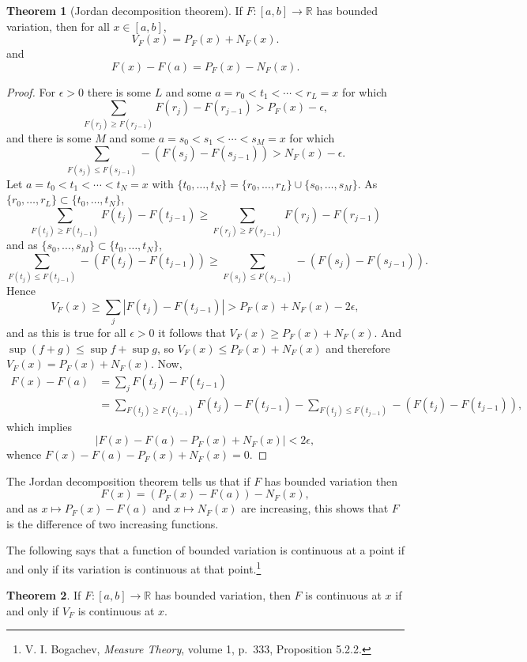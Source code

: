 \documentclass{article}
\theoremstyle{definition}
\newtheorem{theorem}{Theorem}
\theoremstyle{definition}
\begin{document}
\begin{theorem}[Jordan decomposition theorem]
If $F:[a,b] \to \mathbb{R}$ has bounded variation, then for all $x \in [a,b]$,
\[
V_F(x)=P_F(x)+N_F(x).
\]
and
\[
F(x)-F(a) = P_F(x)-N_F(x).
\]
\end{theorem}
\begin{proof}
For $\epsilon>0$ there is some $L$ and some $a=r_0<t_1<\cdots<r_L=x$ for which
\[
 \sum_{F(r_j) \geq F(r_{j-1})} F(r_j)-F(r_{j-1})>P_F(x)-\epsilon,
\]
and there is some $M$ and some $a=s_0<s_1<\cdots<s_M=x$ for which
\[
\sum_{F(s_j) \leq F(s_{j-1})} -(F(s_j)-F(s_{j-1}))>N_F(x)-\epsilon.
\]
Let $a = t_0<t_1<\cdots<t_N=x$ with $\{t_0,\ldots,t_N\} = \{r_0,\ldots,r_L\}
\cup \{s_0,\ldots,s_M\}$.
As $\{r_0,\ldots,r_L\} \subset \{t_0,\ldots,t_N\}$,
\[
 \sum_{F(t_j) \geq F(t_{j-1})} F(t_j)-F(t_{j-1}) \geq  \sum_{F(r_j) \geq F(r_{j-1})} F(r_j)-F(r_{j-1})
\]
and as $\{s_0,\ldots,s_M\} \subset \{t_0,\ldots,t_N\}$,
\[
\sum_{F(t_j) \leq F(t_{j-1})} -(F(t_j)-F(t_{j-1})) \geq \sum_{F(s_j) \leq F(s_{j-1})} -(F(s_j)-F(s_{j-1})).
\]
Hence
\[
V_F(x) \geq \sum_j |F(t_j) - F(t_{j-1})| >  P_F(x)+N_F(x) - 2\epsilon,
\]
and as this is true for all $\epsilon>0$ it follows that  $V_F(x) \geq P_F(x)+N_F(x)$. And $\sup (f+g) \leq \sup f + \sup g$, so
$V_F(x) \leq P_F(x)+N_F(x)$ and therefore $V_F(x)=P_F(x)+N_F(x)$.
Now,
\begin{align*}
F(x)-F(a) &= \sum_j F(t_j)-F(t_{j-1})\\
& = \sum_{F(t_j) \geq F(t_{j-1})} F(t_j)-F(t_{j-1})
-\sum_{F(t_j) \leq  F(t_{j-1})} -(F(t_j)-F(t_{j-1})),
\end{align*}
which implies
\[
|F(x)-F(a)-P_F(x)+N_F(x)| < 2\epsilon,
\]
whence $F(x)-F(a) - P_F(x) + N_F(x)=0$. 
\end{proof}

The Jordan decomposition theorem tells us that if $F$ has bounded variation then
\[
F(x) = (P_F(x)-F(a)) - N_F(x),
\]
and as $x \mapsto P_F(x)-F(a)$ and $x \mapsto N_F(x)$ are increasing, this shows that
$F$ is the difference of two increasing functions. 


The following says that a function of bounded variation is continuous at a point
if and only if its variation is continuous at that point.\footnote{V. I. Bogachev, {\em Measure Theory}, volume 1, p.~333, Proposition 5.2.2.}

\begin{theorem}
If $F:[a,b] \to \mathbb{R}$ has bounded variation, then $F$ is continuous at $x$ if and
only if $V_F$ is continuous at $x$. 
\label{continuity}
\end{theorem}
\end{document}
